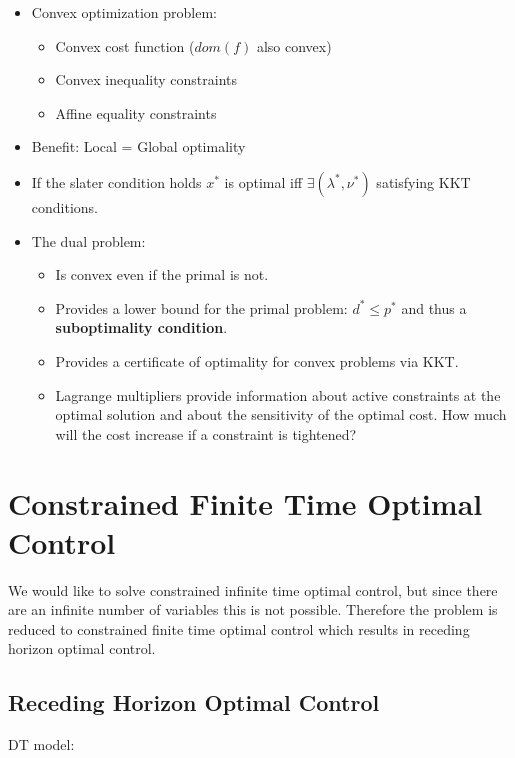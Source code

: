 \documentclass[8pt,a4paper]{scrartcl}
\begin{document}
\begin{multicols*}{3}
\begin{itemize}
\item Convex optimization problem:
\begin{itemize}
\item Convex cost function ($dom(f)$ also convex)
\item Convex inequality constraints
\item Affine equality constraints
\end{itemize}
\item Benefit: Local = Global optimality
\item If the slater condition holds $x^\ast$ is optimal iff $\exists(\lambda^\ast,\nu^\ast)$ satisfying KKT conditions.
\item The dual problem:
\begin{itemize}
\item Is convex even if the primal is not.
\item Provides a lower bound for the primal problem: $d^\ast\leq p^\ast$ and thus a \textbf{suboptimality condition}.
\item Provides a certificate of optimality for convex problems via KKT.
\item Lagrange multipliers provide information about active constraints at the optimal solution and about the sensitivity of the optimal cost. How much will the cost increase if a constraint is tightened?
\end{itemize}
\end{itemize}

\section{Constrained Finite Time Optimal Control}

We would like to solve constrained infinite time optimal control, but since there are an infinite number of variables this is not possible. Therefore the problem is reduced to constrained finite time optimal control which results in receding horizon optimal control.

\subsection{Receding Horizon Optimal Control}

DT model:



\end{multicols*}
\end{document}
